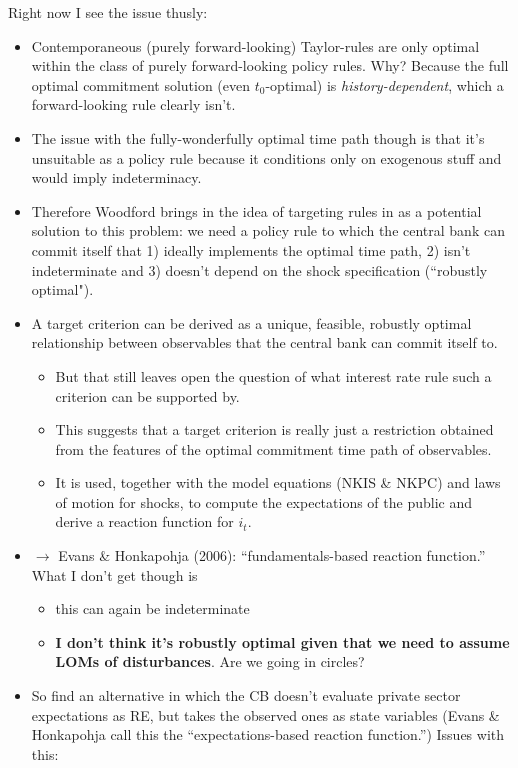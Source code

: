 \documentclass[11pt]{article}
\renewcommand{\[}{\begin{equation}}
\renewcommand{\]}{\end{equation}}
\begin{document}
\begin{enumerate}
Right now I see the issue thusly: 
\begin{itemize}
\item Contemporaneous (purely forward-looking) Taylor-rules are only optimal within the class of purely forward-looking policy rules. Why? Because the full optimal commitment solution (even $t_0$-optimal) is \emph{history-dependent}, which a forward-looking rule clearly isn't.
\item The issue with the fully-wonderfully optimal time path though is that it's unsuitable as a policy rule because it conditions only on exogenous stuff and would imply indeterminacy.
\item Therefore Woodford brings in the idea of targeting rules in as a potential solution to this problem: we need a policy rule to which the central bank can commit itself that 1) ideally implements the optimal time path, 2) isn't indeterminate and 3) doesn't depend on the shock specification (``robustly optimal"). 
\item A target criterion can be derived as a unique, feasible, robustly optimal relationship between observables that the central bank can commit itself to. 
\begin{itemize}
\item  But that still leaves open the question of what interest rate rule such a criterion can be supported by. 
\item This suggests that a target criterion is really just a restriction obtained from the features of the optimal commitment time path of observables.
\item It is used, together with the model equations (NKIS \& NKPC) and laws of motion for shocks, to compute the expectations of the public and derive a reaction function for $i_t$.
\end{itemize}
\item  $\rightarrow $ Evans \& Honkapohja (2006): ``fundamentals-based reaction function.''  What I don't get though is 
\begin{itemize}
\item this can again be indeterminate
\item \textbf{I don't think it's robustly optimal given that we need to assume LOMs of disturbances}. Are we going in circles? 
\end{itemize}
\item So find an alternative in which the CB doesn't evaluate private sector expectations as RE, but takes the observed ones as state variables (Evans \& Honkapohja call this the ``expectations-based reaction function.'')  Issues with this: 

\end{itemize}
\end{enumerate}
\end{document}
